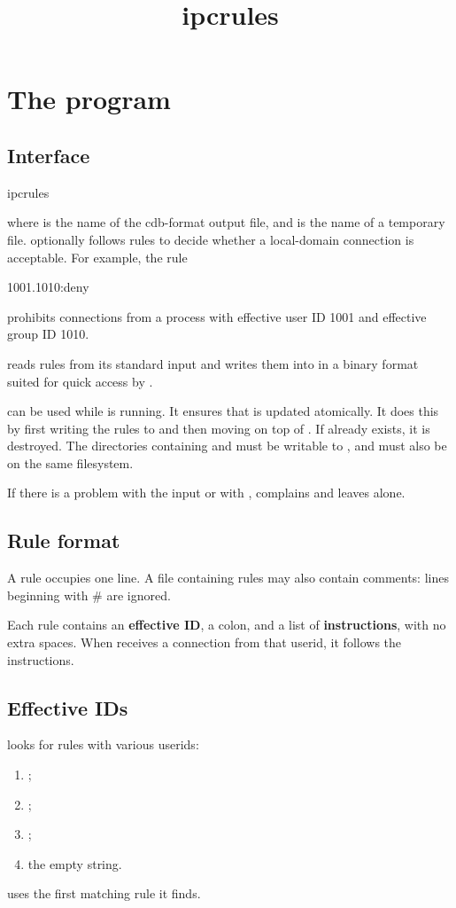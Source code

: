 \documentclass{book}
\title{ipcrules}
\begin{document}
\section{The  program}

\subsection{Interface}
\begin{code}%
  ipcrules  
\end{code}
where  is the name of the cdb-format output file, and
 is the name of a temporary file.
 optionally follows rules to decide whether a
local-domain connection is acceptable.  For example, the rule
\begin{code}%
  1001.1010:deny
\end{code}
prohibits connections from a process with effective user ID 1001 and
effective group ID 1010.

 reads rules from its standard input and writes them
into  in a binary format suited for quick access by
.

 can be used while  is running.  It
ensures that  is updated atomically.  It does this by first
writing the rules to  and then moving  on top of
.  If  already exists, it is destroyed.  The
directories containing  and  must be writable to
, and must also be on the same filesystem.

If there is a problem with the input or with , 
complains and leaves  alone.

\subsection{Rule format}
A rule occupies one line.  A file containing rules may also contain
comments: lines beginning with \# are ignored.

Each rule contains an \textbf{effective ID}, a colon, and a list of
\textbf{instructions}, with no extra spaces.  When 
receives a connection from that userid, it follows the instructions.

\subsection{Effective IDs}
 looks for rules with various userids:
\begin{enumerate}
\item {};
\item {};
\item {};
\item the empty string.
\end{enumerate}
 uses the first matching rule it finds.
\end{document}
